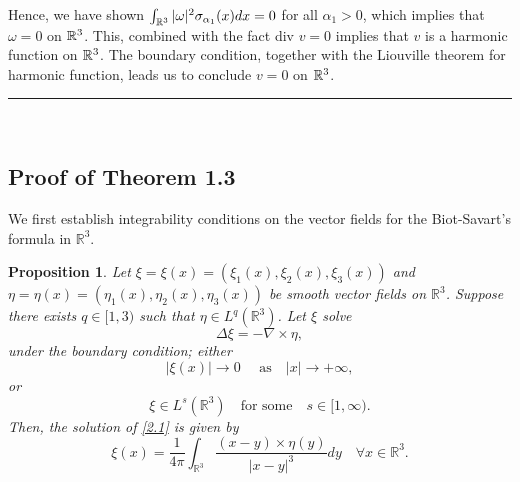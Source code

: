 \documentclass[12pt]{article}
\numberwithin{equation}{section}
\newtheorem{pro}{Proposition}[section]
\theoremstyle{definition}
\begin{document}
Hence, we have shown
$ \int_{\Bbb R^3} |{\omega}|^2 {\sigma}_{{\alpha}_1}(x)dx= 0
$
for all ${\alpha}_1 >0$, which implies that  ${\omega}=0$ on $\Bbb R^3$. This, combined with the fact div $v=0$ implies that $v$ is a harmonic function on $\Bbb R^3$.
The boundary condition, together with the Liouville theorem for harmonic function, leads us to conclude $v=0$ on $\Bbb R^3$.  \hfill {\rule{0.2cm}{0.2cm}}  \\

\subsection{Proof of Theorem 1.3}

We first establish integrability conditions on the vector fields for the Biot-Savart's formula in $\mathbb{R}^3$.
\begin{pro}\label{pro1}
Let $\xi=\xi(x)=(\xi_1(x),\xi_2(x),\xi_3(x))$ and $\eta=\eta(x)=(\eta_1(x),\eta_2(x),\eta_3(x))$ be smooth vector fields on $\mathbb{R}^3$.
Suppose there exists $q\in [1,3)$ such that $\eta \in L^q(\mathbb{R}^3)$. Let $\xi$ solve
\begin{equation}
\Delta\xi=-\nabla\times\eta, \label{2.1}
\end{equation}
under the boundary condition; either
\begin{equation}
|\xi(x)|\rightarrow0\quad\text{ as}\quad|x|\rightarrow+\infty, \label{2.2}
\end{equation}
or
\begin{equation}
\xi \in L^{s}(\mathbb{R}^3)\quad\text{for some}\quad s\in [1,\infty).\label{2.3}
\end{equation}
Then, the solution of \eqref{2.1} is given by
\begin{equation}
\xi(x)=\frac{1}{4\pi}\int_{\mathbb{R}^3}\frac{(x-y)\times\eta(y)}{|x-y|^3} dy\quad \forall x\in \mathbb{R}^3. \label{2.4}
\end{equation}
\end{pro}
\end{document}
